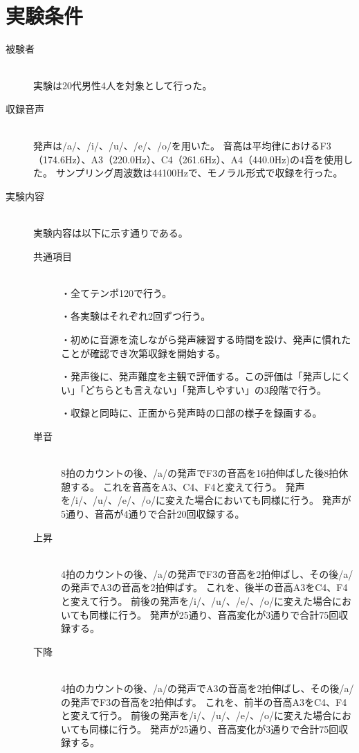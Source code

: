 \documentclass[10.5ptj,a4j,dvipdfmx,uplatex, oneside, openany, report, draft]{jsbook}%
\begin{document}
\section{実験条件}
\begin{description}
    \item[被験者]\mbox{}\\
        実験は20代男性4人を対象として行った。
    \item[収録音声]\mbox{}\\
        発声は/a/、/i/、/u/、/e/、/o/を用いた。
        音高は平均律におけるF3（174.6Hz）、A3（220.0Hz）、C4（261.6Hz）、A4（440.0Hz)の4音を使用した。
        サンプリング周波数は44100Hzで、モノラル形式で収録を行った。
    \item[実験内容]\mbox{}\\
        実験内容は以下に示す通りである。
        \begin{description}
            \item[共通項目]\mbox{}\\
                ・全てテンポ120で行う。
                
                ・各実験はそれぞれ2回ずつ行う。
                
                ・初めに音源を流しながら発声練習する時間を設け、発声に慣れたことが確認でき次第収録を開始する。

                ・発声後に、発声難度を主観で評価する。この評価は「発声しにくい」「どちらとも言えない」「発声しやすい」の3段階で行う。
                
                ・収録と同時に、正面から発声時の口部の様子を録画する。
            \item[単音]\mbox{}\\
                8拍のカウントの後、/a/の発声でF3の音高を16拍伸ばした後8拍休憩する。
                これを音高をA3、C4、F4と変えて行う。
                発声を/i/、/u/、/e/、/o/に変えた場合においても同様に行う。
                発声が5通り、音高が4通りで合計20回収録する。
            \item[上昇]\mbox{}\\
                4拍のカウントの後、/a/の発声でF3の音高を2拍伸ばし、その後/a/の発声でA3の音高を2拍伸ばす。
                これを、後半の音高A3をC4、F4と変えて行う。
                前後の発声を/i/、/u/、/e/、/o/に変えた場合においても同様に行う。
                発声が25通り、音高変化が3通りで合計75回収録する。
            \item[下降]\mbox{}\\
                4拍のカウントの後、/a/の発声でA3の音高を2拍伸ばし、その後/a/の発声でF3の音高を2拍伸ばす。
                これを、前半の音高A3をC4、F4と変えて行う。
                前後の発声を/i/、/u/、/e/、/o/に変えた場合においても同様に行う。
                発声が25通り、音高変化が3通りで合計75回収録する。
        \end{description}


\end{description}
\end{document}
